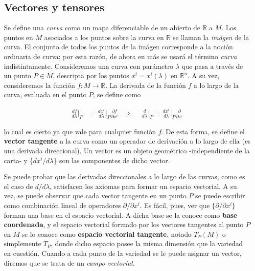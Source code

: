     
    

\subsection{Vectores y tensores}\label{vectores}

Se define una \textit{curva} como un mapa diferenciable de un abierto de $\mathbb{R}$ a $M$. Los puntos en $M$ asociados a los puntos sobre la curva en $\mathbb{R}$ se llaman la \textit{imágen} de la curva. El conjunto de todos los puntos de la imágen corresponde a la noción ordinaria de curva; por esta razón, de ahora en más se usará el término \textit{curva} indistintamente. Consideremos una curva con parámetro $\lambda$ que pasa a través de un punto $P\in M$, descripta por los puntos $x^i=x^i(\lambda)$ en $\mathbb{R}^n$. A su vez, consideremos la función $f:M\rightarrow \mathbb{R}$. La derivada de la función $f$ a lo largo de la curva, evaluada en el punto $P$, se define como 

\begin{align*}
    \frac{df}{d\lambda}\bigg\rvert_P&=\frac{dx^i}{d\lambda}\bigg\rvert_P\frac{\partial f}{\partial x^i} &\Longrightarrow &  &\frac{d}{d\lambda}\bigg\rvert_P=\frac{dx^i}{d\lambda}\bigg\rvert_P\frac{\partial }{\partial x^i}
\end{align*}

lo cual es cierto ya que vale para cualquier función $f$. De esta forma, se define el \textbf{vector tangente} a la curva como un operador de derivación a lo largo de ella (es una derivada direccional). Un vector es un objeto geométrico -independiente de la carta- y $\{dx^i/d\lambda\}$ son las componentes de dicho vector. %

Se puede probar que las derivadas direccionales a lo largo de las curvas, como es el caso de $d/d\lambda$, satisfacen los axiomas para formar un espacio vectorial. A su vez, se puede observar que cada vector tangente en un punto $P$ se puede escribir como combinación lineal de operadores $\partial/\partial x^i$. Es fácil, pues, ver que  $\{\partial/\partial x^i\}$ forman una base en el espacio vectorial. A dicha base se la conoce como \textbf{base coordenada}, y el espacio vectorial formado por los vectores tangentes al punto $P$ en $M$ se lo conoce como \textbf{espacio vectorial tangente}, notado $T_P(M)$ o simplemente $T_P$, donde dicho espacio posee la misma dimensión que la variedad en cuestión. Cuando a cada punto de la variedad se le puede asignar un vector, diremos que se trata de un \textit{campo vectorial}. 


